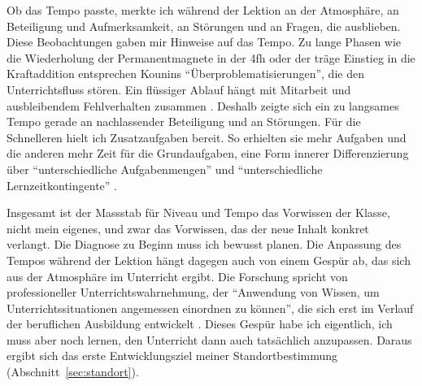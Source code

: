 \documentclass[12pt,a4paper]{article}
\begin{document}
Ob das Tempo passte, merkte ich während der Lektion an der Atmosphäre, an
Beteiligung und Aufmerksamkeit, an Störungen und an Fragen, die ausblieben.
Diese Beobachtungen gaben mir Hinweise auf das Tempo. Zu lange
Phasen wie die Wiederholung der Permanentmagnete in der 4fh oder der träge
Einstieg in die Kraftaddition entsprechen Kounins
\enquote{Überproblematisierungen}, die den Unterrichtsfluss stören. Ein
flüssiger Ablauf hängt mit Mitarbeit und ausbleibendem Fehlverhalten
zusammen \parencite[124]{seidel2020}. Deshalb zeigte sich ein zu langsames
Tempo gerade an nachlassender Beteiligung und an Störungen. Für die Schnelleren hielt ich
Zusatzaufgaben bereit. So erhielten sie mehr Aufgaben und die anderen mehr
Zeit für die Grundaufgaben, eine Form innerer Differenzierung über
\enquote{unterschiedliche Aufgabenmengen} und \enquote{unterschiedliche
Lernzeitkontingente} \parencite[97]{lipowsky2020}.

Insgesamt ist der Massstab für Niveau und Tempo das Vorwissen der Klasse, nicht
mein eigenes, und zwar das Vorwissen, das der neue Inhalt konkret verlangt.
Die Diagnose zu Beginn muss ich bewusst planen.
Die Anpassung des Tempos während der Lektion hängt dagegen auch von einem
Gespür ab, das sich aus der Atmosphäre im Unterricht ergibt. Die Forschung
spricht von professioneller Unterrichtswahrnehmung, der \enquote{Anwendung
von Wissen, um Unterrichtssituationen angemessen einordnen zu können}, die
sich erst im Verlauf der beruflichen Ausbildung entwickelt
\parencite[273]{kunter2020}. Dieses Gespür habe ich eigentlich, ich muss aber
noch lernen, den Unterricht dann auch tatsächlich anzupassen. Daraus ergibt
sich das
erste Entwicklungsziel meiner Standortbestimmung
(Abschnitt~\ref{sec:standort}).


\end{document}
